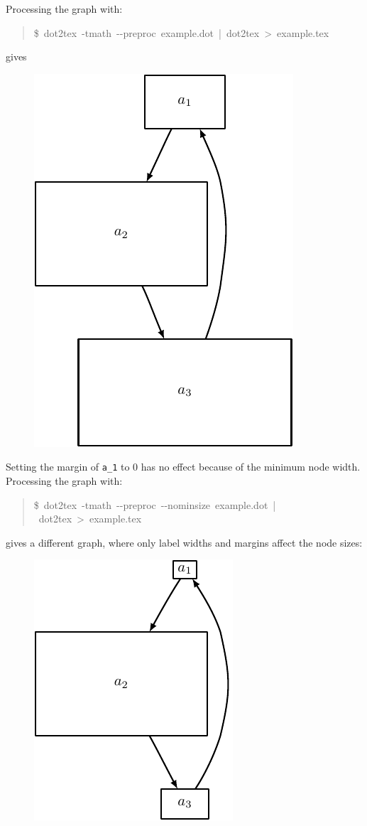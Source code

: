 \documentclass[10pt,a4paper,english]{article}
\begin{document}
Processing the graph with:
\begin{quote}{\ttfamily \raggedright \noindent
{\$}~dot2tex~-tmath~-{}-preproc~example.dot~|~dot2tex~>~example.tex
}\end{quote}

gives
\begin{figure}[H]
\centering

\includegraphics{pdf/nodewidth1}
\end{figure}

Setting the margin of \texttt{a{\_}1} to 0 has no effect because of the minimum node width. Processing the graph with:
\begin{quote}{\ttfamily \raggedright \noindent
{\$}~dot2tex~-tmath~-{}-preproc~-{}-nominsize~example.dot~|~dot2tex~>~example.tex
}\end{quote}

gives a different graph, where only label widths and margins affect the node sizes:
\begin{figure}[H]
\centering

\includegraphics{pdf/nodewidth2}
\end{figure}
\end{document}
